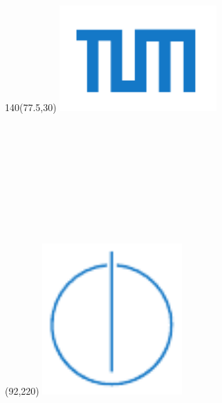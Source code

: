 \begin{titlepage}

\begin{textblock}{140}(77.5,30)
	\includegraphics[width=0.45\textwidth]{source/images/TUM_Logos/TUM_blau.pdf}
\end{textblock}



\begin{center}
~\\ \vspace{4cm}
{\Large \sffamily \Uni}\\[1mm]
{\Large \sffamily \fachbereich} \\[1mm]
{\Large \sffamily \Labor}
\vspace{2cm}

{\Large \ArtDerArbeit}\\
\vspace{1.0cm}
{\huge \TitelArbeit \par} ~\\[2mm]


\vspace{3.0cm}

\Large \textbf{\DeinName}\\

\vspace{2.5cm}

\end{center}

\begin{textblock}{90}(92,220)
	\includegraphics[width=0.4\textwidth]{source/images/TUM_Logos/IN_blau.pdf}
\end{textblock}

\end{titlepage}